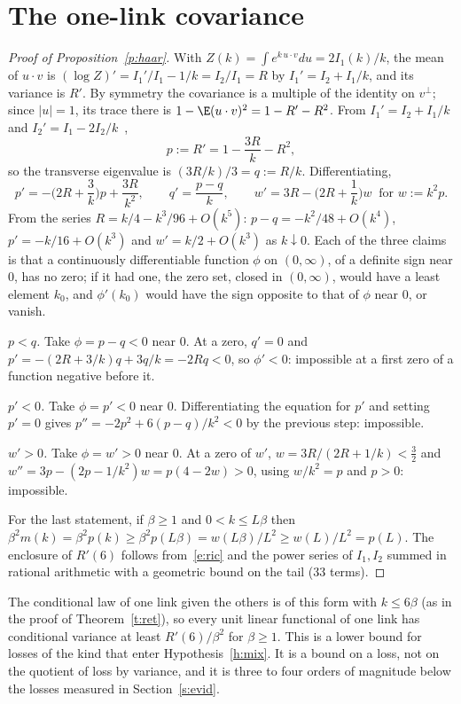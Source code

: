 \section{The one-link covariance}\label{s:haar}
\begin{proof}[Proof of Proposition~\ref{p:haar}]
With $Z(k)=\int e^{k\,u\cdot v}du=2I_1(k)/k$, the mean of $u\cdot v$ is $(\log Z)'=I_1'/I_1-1/k=I_2/I_1=R$ by
$I_1'=I_2+I_1/k$, and its variance is $R'$. By symmetry the covariance is a multiple of the identity on
$v^\perp$; since $|u|=1$, its trace there is $1-\E(u\cdot v)^2=1-R'-R^2$. From $I_1'=I_2+I_1/k$ and
$I_2'=I_1-2I_2/k$~\cite[10.29.2]{DLMF},
\begin{equation}\label{e:ric}
p:=R'=1-\frac{3R}{k}-R^2,
\end{equation}
so the transverse eigenvalue is $(3R/k)/3=q:=R/k$. Differentiating,
\[
p'=-\Big(2R+\frac3k\Big)p+\frac{3R}{k^2},\qquad q'=\frac{p-q}{k},\qquad
w'=3R-\Big(2R+\frac1k\Big)w\ \text{ for }w:=k^2p .
\]
From the series $R=k/4-k^3/96+O(k^5)$: $p-q=-k^2/48+O(k^4)$, $p'=-k/16+O(k^3)$ and $w'=k/2+O(k^3)$ as
$k\downarrow0$. Each of the three claims is that a continuously differentiable function $\phi$ on $(0,\infty)$,
of a definite sign near $0$, has no zero; if it had one, the zero set, closed in $(0,\infty)$, would have a
least element $k_0$, and $\phi'(k_0)$ would have the sign opposite to that of $\phi$ near $0$, or vanish.

\emph{$p<q$.} Take $\phi=p-q<0$ near $0$. At a zero, $q'=0$ and $p'=-(2R+3/k)q+3q/k=-2Rq<0$, so $\phi'<0$:
impossible at a first zero of a function negative before it.

\emph{$p'<0$.} Take $\phi=p'<0$ near $0$. Differentiating the equation for $p'$ and setting $p'=0$ gives
$p''=-2p^2+6(p-q)/k^2<0$ by the previous step: impossible.

\emph{$w'>0$.} Take $\phi=w'>0$ near $0$. At a zero of $w'$, $w=3R/(2R+1/k)<\tfrac32$ and
$w''=3p-(2p-1/k^2)w=p(4-2w)>0$, using $w/k^2=p$ and $p>0$: impossible.

For the last statement, if $\beta\ge1$ and $0<k\le L\beta$ then
$\beta^2m(k)=\beta^2p(k)\ge\beta^2p(L\beta)=w(L\beta)/L^2\ge w(L)/L^2=p(L)$. The enclosure of $R'(6)$ follows
from~\eqref{e:ric} and the power series of $I_1,I_2$ summed in rational arithmetic with a geometric bound on
the tail (33 terms).
\end{proof}

\begin{remark}\label{r:haar}
The conditional law of one link given the others is of this form with $k\le6\beta$ (as in the proof of
Theorem~\ref{t:ret}), so every unit linear functional of one link has conditional variance at least
$R'(6)/\beta^2$ for $\beta\ge1$. This is a lower bound for losses of the kind that enter
Hypothesis~\ref{h:mix}. It is a bound on a loss, not on the quotient of loss by variance, and it is three to
four orders of magnitude below the losses measured in Section~\ref{s:evid}.
\end{remark}

